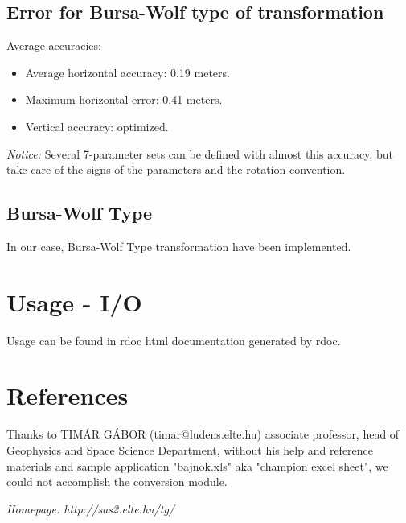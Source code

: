 \documentclass[10pt]{article}
\begin{document}
	\subsection{Error for Bursa-Wolf type of transformation}
	Average accuracies:
	\begin{itemize}
		\item Average horizontal accuracy: 0.19 meters.
		\item Maximum horizontal error: 0.41 meters.
		\item Vertical accuracy: optimized.
	\end{itemize}
	\emph{Notice:} Several 7-parameter sets can be defined with almost this accuracy, but take care of
	the signs of the parameters and the rotation convention.
	
	\subsection{Bursa-Wolf Type}
	In our case, Bursa-Wolf Type transformation have been implemented.

\section{Usage - I/O}
	Usage can be found in rdoc html documentation generated by rdoc.
	
	
\section{References}
	Thanks to TIMÁR GÁBOR (timar@ludens.elte.hu) associate professor, head of Geophysics and Space Science Department,
	without his help and reference materials and sample application "bajnok.xls" aka "champion excel sheet",
	we could not accomplish the conversion module.
	
	\emph{Homepage: http://sas2.elte.hu/tg/}



\end{document}
